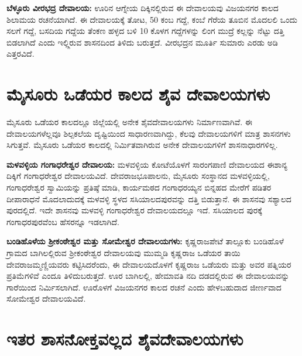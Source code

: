 \textbf{ಬೆಳ್ಳೂರು ವೀರಭದ್ರ ದೇವಾಲಯ:} ಊರಿನ ಆಗ್ನೇಯ ದಿಕ್ಕಿನಲ್ಲಿರುವ ಈ ದೇವಾಲಯವು ವಿಜಯನಗರ ಕಾಲದ ಶಿಲಾಮಯ ರಚನೆಯಾಗಿದೆ. ಈ ದೇವಾಲಯಕ್ಕೆ ತೋಟ, 50 ಕಂಬ ಗದ್ದೆ, ಕಂಬೆ ಗೆರೆಯ ತೂಬಿನ ಮೊದಲಲಿ ಒಂದು ಸಲಗೆ ಗದ್ದೆ, ಬಸದಿಯ ಗದ್ದೆಯ ತೆಂಕಣ ಹಳ್ಳದ ಬಳಿ 10 ಕೊಳಗ ಗದ್ದೆಗಳನ್ನು ಲಿಂಗ ಮುದ್ರೆ ಕಲ್ಲನ್ನು ನೆಟ್ಟು ದತ್ತಿ ಬಿಡಲಾಗಿದೆ ಎಂದು ಇಲ್ಲ್ಲಿರುವ ಶಾಸನದಿಂದ ತಿಳಿದು ಬರುತ್ತದೆ. ವೀರಭದ್ರನ ಮೂರ್ತಿ ಸುಮಾರು ಎರಡು ಅಡಿ ಎತ್ತರವಿದೆ.


\section*{ಮೈಸೂರು ಒಡೆಯರ ಕಾಲದ ಶೈವ ದೇವಾಲಯಗಳು}

ಮೈಸೂರು ಒಡೆಯರ ಕಾಲದಲ್ಲೂ ಜಿಲ್ಲೆಯಲ್ಲಿ ಅನೇಕ ಶೈವದೇವಾಲಯಗಳು ನಿರ್ಮಾಣವಾಗಿವೆ. ಈ ದೇವಾಲಯಗಳೆಲ್ಲವೂ ಶಿಲ್ಪಕಲೆಯ ದೃಷ್ಟಿಯಿಂದ ಸಾಧಾರಣವಾಗಿದ್ದು, ಕೆಲವು ದೇವಾಲಯಗಳಿಗೆ ಮಾತ್ರ ಶಾಸನಗಳು ಸಿಗುತ್ತವೆ. ಮೈಸೂರು ಒಡೆಯರ ಕಾಲದಲ್ಲಿ ನಿರ್ಮಿತವಾಗಿರುವ ಅನೇಕ ದೇವಾಲಯಗಳಿಗೆ ಶಾಸನಾಧಾರಗಳಿಲ್ಲ.

\textbf{ಮಳವಳ್ಳಿಯ ಗಂಗಾಧರೇಶ್ವರ ದೇವಾಲಯ:} ಮಳವಳ್ಳಿಯ ಕೋಟೆಯೊಳಗೆ ಸಾರಂಗಪಾಣಿ ದೇವಾಲಯದ ಈಶಾನ್ಯ ದಿಕ್ಕಿಗೆ ಗಂಗಾಧರೇಶ್ವರ ದೇವಾಲಯವಿದೆ. ದೇವರಾಜಭೂಪಾಲನು, ಮೈಸೂರು ಸಂಸ್ಥಾನದ ಮಳವಳ್ಳಿಯಲ್ಲಿ, ಗಂಗಾಧರೇಶ್ವರ ಸ್ವಾಮಿಯನ್ನು ಪ್ರತಿಷ್ಠೆ ಮಾಡಿ, ಕಾರ್ಯಮಠದ ಗಂಗಾಧರಯ್ಯನ ಬಿನ್ನಹದ ಮೇರೆಗೆ ಪಡಿತರ ದೀಪಾರಾಧನೆ ಮೊದಲಾದುದಕ್ಕೆ ಮಳವಳ್ಳಿ ಸ್ಥಳದ ಸಸಿಯಾಲದಪುರವನ್ನು ದತ್ತಿ ಬಿಡುತ್ತಾನೆ. ಈ ಶಾಸನವು ಸಶ್ಯಾಲದ ಪುರದಲ್ಲಿದೆ. ಇದೇ ಶಾಸನವು ಮಳವಳ್ಳಿ ಗಂಗಾಧರೇಶ್ವರ ದೇವಾಲಯದಲ್ಲೂ ಇದೆ. ಸಸಿಯಾಲದ ಪುರಕ್ಕೆ ಗಂಗಾಧರಪುರವೆಂಬ ಹೆಸರನ್ನೂ ಇಡಲಾಗಿದೆ.

\textbf{ಬಂಡಿಹೊಳೆಯ ಶ‍್ರೀಕಂಠೇಶ್ವರ ಮತ್ತು ಸೋಮೇಶ್ವರ ದೇವಾಲಯಗಳು:} ಕೃಷ್ಣರಾಜಪೇಟೆ ತಾಲ್ಲೂಕು ಬಂಡಿಹೊಳೆ ಗ್ರಾಮದ ಬಾಗಿಲಲ್ಲಿರುವ ಶ‍್ರೀಕಂಠೇಶ್ವರ ದೇವಾಲಯವು ಮುಮ್ಮಡಿ ಕೃಷ್ಣರಾಜ ಒಡೆಯರ ತಾಯಿ ದೇವರಾಜಮ್ಮಣ್ಣಿಯವರು ಕಟ್ಟಿಸಿದರೆಂದು, ಈ ದೇವಾಲಯದೊಳಗೆ ಕೃಷ್ಣರಾಜ ಒಡೆಯರು ಮತ್ತು ಅವರ ಪತ್ನಿಯರ ಪ್ರತಿಮೆಗಳಿವೆ ಎಂದೂ ತಿಳಿದು\-ಬರುತ್ತದೆ. ಊರ ಬಾಗಿಲಲ್ಲಿ, ಹೇಮಾವತಿ ನದಿ ದಡದಲ್ಲಿರುವ ಈ ದೇವಾಲಯವನ್ನು ಗಾರೆಯಿಂದ ನಿರ್ಮಿಸಲಾಗಿದೆ. ಊರೊಳಗೆ ವಿಜಯನಗರ ಕಾಲದ ರಚನೆ ಎಂದು ಹೇಳಬಹುದಾದ ಜೀರ್ಣವಾದ ಸೋಮೇಶ್ವರ ದೇವಾಲಯವಿದೆ.


\section*{ಇತರ ಶಾಸನೋಕ್ತವಲ್ಲದ ಶೈವದೇವಾಲಯಗಳು}

